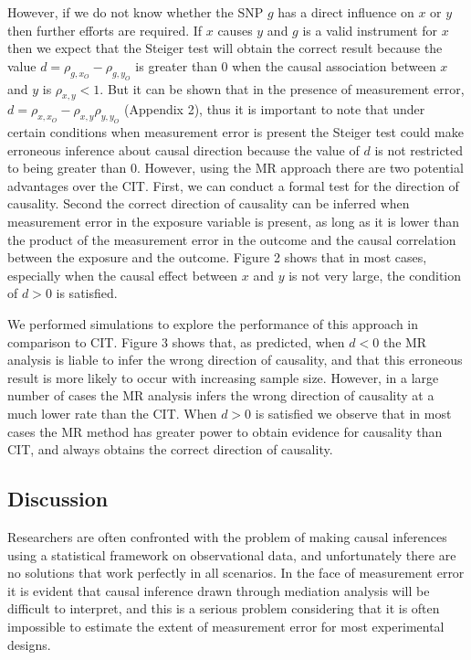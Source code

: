 \documentclass[]{article}
\begin{document}
However, if we do not know whether the SNP $g$ has a direct influence on
$x$ or $y$ then further efforts are required. If $x$ causes $y$ and $g$
is a valid instrument for $x$ then we expect that the Steiger test will
obtain the correct result because the value
$d = \rho_{g, x_O} - \rho_{g, y_O}$ is greater than 0 when the causal
association between $x$ and $y$ is $\rho_{x, y} < 1$. But it can be
shown that in the presence of measurement error,
$d = \rho_{x, x_O} - \rho_{x,y}\rho_{y,y_O}$ (Appendix 2), thus it is
important to note that under certain conditions when measurement error
is present the Steiger test could make erroneous inference about causal
direction because the value of $d$ is not restricted to being greater
than 0. However, using the MR approach there are two potential
advantages over the CIT. First, we can conduct a formal test for the
direction of causality. Second the correct direction of causality can be
inferred when measurement error in the exposure variable is present, as
long as it is lower than the product of the measurement error in the
outcome and the causal correlation between the exposure and the outcome.
Figure 2 shows that in most cases, especially when the causal effect
between $x$ and $y$ is not very large, the condition of $d > 0$ is
satisfied.

We performed simulations to explore the performance of this approach in
comparison to CIT. Figure 3 shows that, as predicted, when $d < 0$ the
MR analysis is liable to infer the wrong direction of causality, and
that this erroneous result is more likely to occur with increasing
sample size. However, in a large number of cases the MR analysis infers
the wrong direction of causality at a much lower rate than the CIT. When
$d > 0$ is satisfied we observe that in most cases the MR method has
greater power to obtain evidence for causality than CIT, and always
obtains the correct direction of causality.

\subsection{Discussion}\label{discussion}

Researchers are often confronted with the problem of making causal
inferences using a statistical framework on observational data, and
unfortunately there are no solutions that work perfectly in all
scenarios. In the face of measurement error it is evident that causal
inference drawn through mediation analysis will be difficult to
interpret, and this is a serious problem considering that it is often
impossible to estimate the extent of measurement error for most
experimental designs.
\end{document}
